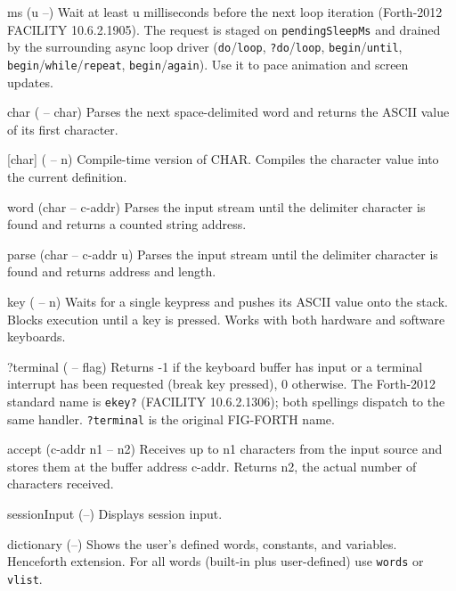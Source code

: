 \documentclass[a4paper, 11pt, openany]{book}
\begin{document}
\begin{forthbox}
  ms           (u --)
               Wait at least u milliseconds before the next loop
               iteration (Forth-2012 FACILITY 10.6.2.1905). The
               request is staged on \texttt{pendingSleepMs} and
               drained by the surrounding async loop driver
               (\texttt{do}/\texttt{loop}, \texttt{?do}/\texttt{loop},
               \texttt{begin}/\texttt{until},
               \texttt{begin}/\texttt{while}/\texttt{repeat},
               \texttt{begin}/\texttt{again}). Use it to pace
               animation and screen updates.

  char         ( -- char)
               Parses the next space-delimited word and returns
               the ASCII value of its first character.

  [char]       ( -- n)
               Compile-time version of CHAR. Compiles the
               character value into the current definition.

  word         (char -- c-addr)
               Parses the input stream until the delimiter
               character is found and returns a counted string
               address.

  parse        (char -- c-addr u)
               Parses the input stream until the delimiter
               character is found and returns address and length.

  key          ( -- n)
               Waits for a single keypress and pushes its ASCII
               value onto the stack. Blocks execution until a key
               is pressed. Works with both hardware and software
               keyboards.

  ?terminal    ( -- flag)
               Returns -1 if the keyboard buffer has input or a
               terminal interrupt has been requested (break key
               pressed), 0 otherwise. The Forth-2012 standard name
               is \texttt{ekey?} (FACILITY 10.6.2.1306); both
               spellings dispatch to the same handler. \texttt{?terminal}
               is the original FIG-FORTH name.

  accept       (c-addr n1 -- n2)
               Receives up to n1 characters from the input source
               and stores them at the buffer address c-addr.
               Returns n2, the actual number of characters
               received.

  sessionInput (--)
               Displays session input.

  dictionary   (--)
               Shows the user's defined words, constants, and
               variables. Henceforth extension. For all words
               (built-in plus user-defined) use \texttt{words} or
               \texttt{vlist}.


\end{forthbox}
\end{document}
